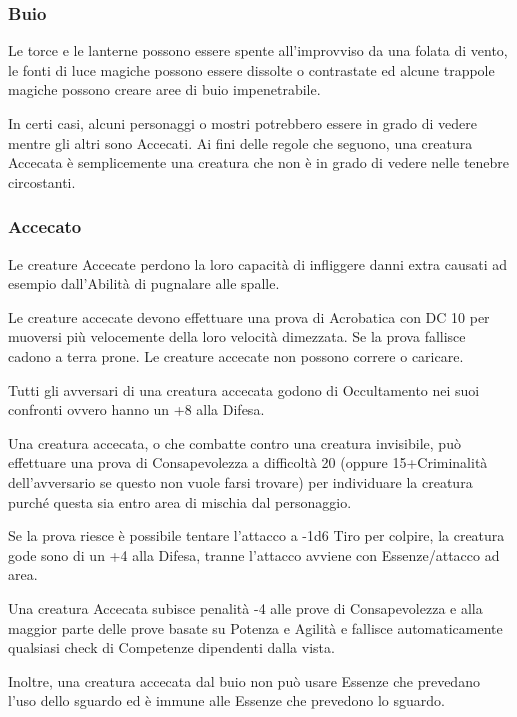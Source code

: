 \documentclass[a4paper,11pt,twoside,openany]{book}
\begin{document}
\subsubsection{Buio}

\label{buio}

Le torce e le lanterne possono essere spente all'improvviso da una folata di vento, le fonti di luce magiche possono essere dissolte o contrastate ed alcune trappole magiche possono creare aree di buio impenetrabile.

In certi casi, alcuni personaggi o mostri potrebbero essere in grado di vedere mentre gli altri sono Accecati. Ai fini delle regole che seguono, una creatura Accecata è semplicemente una creatura che non è in grado di vedere nelle tenebre circostanti.

\subsubsection{Accecato}

\label{accecato}

Le creature Accecate perdono la loro capacità di infliggere danni extra causati ad esempio dall'Abilità di pugnalare alle spalle.

Le creature accecate devono effettuare una prova di Acrobatica con DC 10 per muoversi più velocemente della loro velocità dimezzata. Se la prova fallisce cadono a terra prone. Le creature accecate non possono correre o caricare.

Tutti gli avversari di una creatura accecata godono di Occultamento nei suoi confronti ovvero hanno un +8 alla Difesa.

Una creatura accecata, o che combatte contro una creatura invisibile, può effettuare una prova di Consapevolezza a difficoltà 20 (oppure 15+Criminalità dell'avversario se questo non vuole farsi trovare) per individuare la creatura purché questa sia entro area di mischia dal personaggio.

Se la prova riesce è possibile tentare l'attacco a -1d6 Tiro per colpire, la creatura gode sono di un +4 alla Difesa, tranne l'attacco avviene con Essenze/attacco ad area.

Una creatura Accecata subisce penalità -4 alle prove di Consapevolezza e alla maggior parte delle prove basate su Potenza e Agilità e fallisce automaticamente qualsiasi check di Competenze dipendenti dalla vista.

Inoltre, una creatura accecata dal buio non può usare Essenze che prevedano l'uso dello sguardo ed è immune alle Essenze che prevedono lo sguardo.
\end{document}
